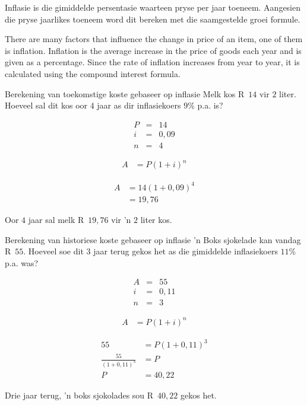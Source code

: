 Inflasie is die gimiddelde persentasie waarteen pryse per jaar toeneem. Aangesien die pryse jaarlikes toeneem word dit bereken met die saamgestelde groei formule.\par
There are many factors that influence the change in price of an item,
one of them is inflation. Inflation is the average increase in the
price of goods each year and is given as a percentage. Since the rate
of inflation increases from year to year, it is calculated using the
compound interest formula.



\begin{wex}{Berekening van toekomstige koste gebaseer op inflasie}
    {Melk kos R~$14$ vir $2$ liter. Hoeveel sal dit kos oor $4$ jaar as dir inflasiekoers $9\%$ p.a. is?}{
    
    \begin{eqnarray*}
	P &=& 14\\
	i &=& 0,09\\
	n &=& 4
    \end{eqnarray*}

    \begin{align*}
	A &= P(1 + i)^n
    \end{align*}

    \begin{align*}
	A &= 14(1 + 0,09)^4\\
	  &= 19,76
    \end{align*}

    Oor $4$ jaar sal melk R~$19,76$ vir 'n $2$ liter kos.
    }
\end{wex}


\begin{wex}{Berekening van historiese koste gebaseer op inflasie}
    {'n Boks sjokelade kan vandag R~$55$. Hoeveel soe dit $3$ jaar terug gekos het as die gimiddelde inflasiekoers $11\%$ p.a. was?}
{
    \begin{eqnarray*}
	A &=& 55\\
	i &=& 0,11\\
	n &=& 3
    \end{eqnarray*}

    \begin{align*}
	A &= P(1 + i)^n
    \end{align*}

    \begin{align*}
	55 &= P(1 + 0,11)^3\\
	\frac{55}{(1 + 0,11)^3} &= P\\
	P  &= 40,22
    \end{align*}

    Drie jaar terug, 'n boks sjokolades sou R~$40,22$ gekos het.
    }
\end{wex}


